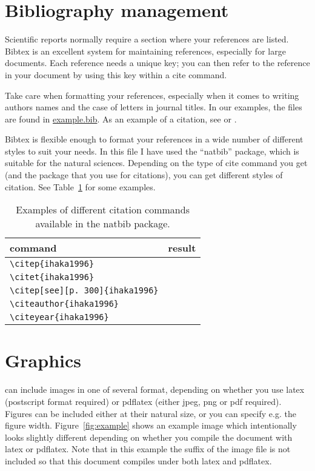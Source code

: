\documentclass[12pt]{article}
\begin{document}
\section{Bibliography management}

Scientific reports normally require a section where your references
are listed.  Bibtex is an excellent system for maintaining references,
especially for large documents.  Each reference needs a unique key;
you can then refer to the reference in your \latex document by using
this key within a cite command.

Take care when formatting your references, especially when it comes to
writing authors names and the case of letters in journal titles.  In
our examples, the files are found in \url{example.bib}.  As an example
of a citation, see \citep{ihaka1996} or \citep{ihaka1996,venables1999}.

Bibtex is flexible enough to format your references in a wide number
of different styles to suit your needs.  In this file I have used the
``natbib'' package, which is suitable for the natural sciences.
Depending on the type of cite command you get (and the package that
you use for citations), you can get different styles of citation.  See
Table~\ref{tab:cite} for some examples.

\begin{table}
  \centering
  \begin{tabular}{ll}
    \hline
    command & result\\ \hline
    \verb+\citep{ihaka1996}+ & \citep{ihaka1996}\\
    \verb+\citet{ihaka1996}+ & \citet{ihaka1996}\\
    \verb+\citep[see][p. 300]{ihaka1996}+ &
    \citep[see][p. 300]{ihaka1996}
    \\
    \verb+\citeauthor{ihaka1996}+ & \citeauthor{ihaka1996}
    \\
    \verb+\citeyear{ihaka1996}+ & \citeyear{ihaka1996}
    \\
    \hline
  \end{tabular}
  \caption{Examples of different citation commands available in the
  natbib package.}
  \label{tab:cite}
\end{table}


\section{Graphics}
\label{sec:graphics}

\latex can include images in one of several format, depending on
whether you use latex (postscript format required) or pdflatex (either
jpeg, png or pdf required).  Figures can be included either at their
natural size, or you can specify e.g. the figure width.
Figure~\ref{fig:example} shows an example image which intentionally
looks slightly different depending on whether you compile the document
with latex or pdflatex.  Note that in this example the suffix of the
image file is not included so that this document compiles under both
latex and pdflatex.
\end{document}
